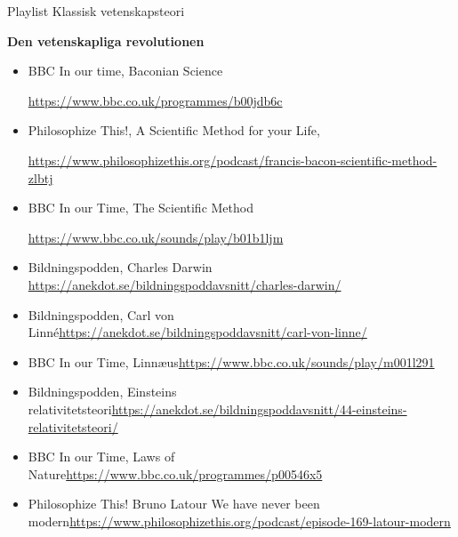 \documentclass[11pt,a4paper]{report}
\begin{document}
\begin{LARGE}
Playlist Klassisk vetenskapsteori
\end{LARGE}
\newline
\newline


\textbf{Den vetenskapliga revolutionen}

\begin{itemize}
\item BBC In our time, Baconian Science 

\href{https://www.bbc.co.uk/programmes/b00jdb6c}{https://www.bbc.co.uk/programmes/b00jdb6c}

\item Philosophize This!, A Scientific Method for your Life, 

\href{https://www.philosophizethis.org/podcast/francis-bacon-scientific-method-zlbtj}{https://www.philosophizethis.org/podcast/francis-bacon-scientific-method-zlbtj}

\item BBC In our Time, The Scientific Method 

\href{https://www.bbc.co.uk/sounds/play/b01b1ljm}{https://www.bbc.co.uk/sounds/play/b01b1ljm}

\item Bildningspodden, Charles Darwin \newline \href{https://anekdot.se/bildningspoddavsnitt/charles-darwin/}{https://anekdot.se/bildningspoddavsnitt/charles-darwin/}

\item Bildningspodden, Carl von Linné\newline \href{https://anekdot.se/bildningspoddavsnitt/carl-von-linne/}{https://anekdot.se/bildningspoddavsnitt/carl-von-linne/}

\item BBC In our Time, Linnæus\newline \href{https://www.bbc.co.uk/sounds/play/m001l291}{https://www.bbc.co.uk/sounds/play/m001l291}

\item Bildningspodden, Einsteins relativitetsteori\newline \href{https://anekdot.se/bildningspoddavsnitt/44-einsteins-relativitetsteori/}{https://anekdot.se/bildningspoddavsnitt/44-einsteins-relativitetsteori/}

\item BBC In our Time, Laws of Nature\newline \href{https://www.bbc.co.uk/programmes/p00546x5}{https://www.bbc.co.uk/programmes/p00546x5}

\item Philosophize This! Bruno Latour We have never been modern\newline \href{https://www.philosophizethis.org/podcast/episode-169-latour-modern}{https://www.philosophizethis.org/podcast/episode-169-latour-modern}




\end{itemize}
\end{document}
